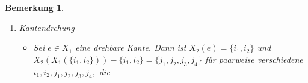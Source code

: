 \documentclass[12pt,titlepage,twoside,cleardoublepage]{article}
\theoremstyle{nummermitklammern}
\newtheorem{bemerkung}[temp]{Bemerkung}
\newtheorem{bemerkung}[zahl]{Bemerkung}
\numberwithin{equation}{section}
\begin{document}
\begin{bemerkung}
\begin{enumerate}
\begin{itemize}
\[{\begin{tabular}[l]{lcr}
\end{tabular}}
\]
und den Vektor $w\in \{0,1\}^n $
\[
w_{i}=
\Biggl{\{\begin{tabular}[l]{lcr}
1,& $i=i_2,j_2$\\
0,& sonst\\ 
\end{tabular}}
\]
indem man diese zur Blockmatrix 
\[
\left[ 
\begin{array}{c|cc} 
  F & v& w \\ 
  \hline 
  v^{tr}& 0 &1 \\
  w^{tr} &1 &0  \\
\end{array} 
\right]
\]
zusammensetzt.
\end{itemize} 
\item Kantendrehung
\begin{itemize} 

\item Sei $e \in X_1$ eine drehbare Kante. Dann ist $X_2(e)=\{i_1,i_2\}$ und $X_2(X_1(\{i_1,i_2\}))-\{i_1,i_2\}=\{j_1,j_2,j_3,j_4\}$ für paarweise verschiedene $i_1,i_2,j_1,j_2,j_3,j_4,$ die 


\end{itemize}
\end{enumerate}
\end{bemerkung}
\end{document}

